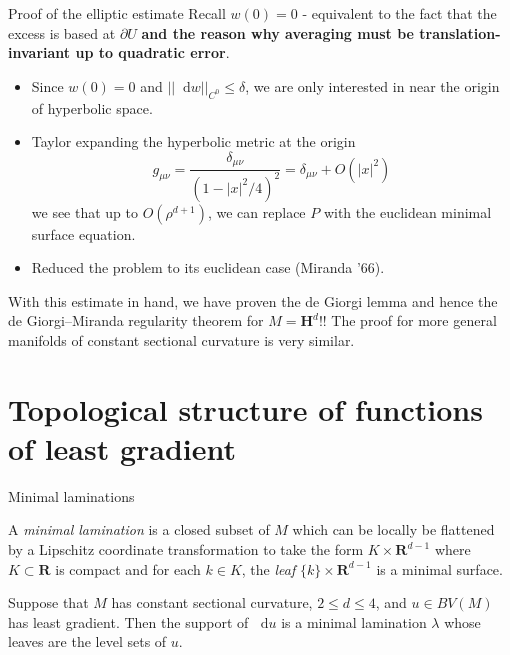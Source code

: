 \documentclass[10pt]{beamer}
\newcommand{\RR}{\mathbf{R}}
\newcommand{\Hyp}{\mathbf H}
\newcommand*\dif{\mathop{}\!\mathrm{d}}
\newcommand{\dfn}[1]{\emph{#1}\index{#1}}
\begin{document}
\begin{frame}{Proof of the elliptic estimate}
Recall $w(0) = 0$ - equivalent to the fact that the excess is based at $\partial U$ \textbf{and the reason why averaging must be translation-invariant up to quadratic error}.\pause

\begin{itemize}
\item Since $w(0) = 0$ and $||\dif w||_{C^0} \leq \delta$, we are only interested in near the origin of hyperbolic space.\pause
\item Taylor expanding the hyperbolic metric at the origin
$$g_{\mu\nu} = \frac{\delta_{\mu\nu}}{(1 - |x|^2/4)^2} = \delta_{\mu\nu} + O(|x|^2)$$
we see that up to $O(\rho^{d + 1})$, we can replace $P$ with the euclidean minimal surface equation.\pause
\item Reduced the problem to its euclidean case (Miranda '66).\pause
\end{itemize}

With this estimate in hand, we have proven the de Giorgi lemma and hence the de Giorgi--Miranda regularity theorem for $M = \Hyp^d$!!
The proof for more general manifolds of constant sectional curvature is very similar.
\end{frame}

\section{Topological structure of functions of least gradient}

\begin{frame}{Minimal laminations}
\begin{definition}
A \dfn{minimal lamination} is a closed subset of $M$ which can be locally be flattened by a Lipschitz coordinate transformation to take the form $K \times \RR^{d - 1}$ where $K \subset \RR$ is compact and for each $k \in K$, the \dfn{leaf} $\{k\} \times \RR^{d - 1}$ is a minimal surface.
\end{definition}\pause

\begin{theorem}[--, '22]
    Suppose that $M$ has constant sectional curvature, $2 \leq d \leq 4$, and $u \in BV(M)$ has least gradient.
    Then the support of $\dif u$ is a minimal lamination $\lambda$ whose leaves are the level sets of $u$.
    \end{theorem}
\end{frame}
\end{document}
